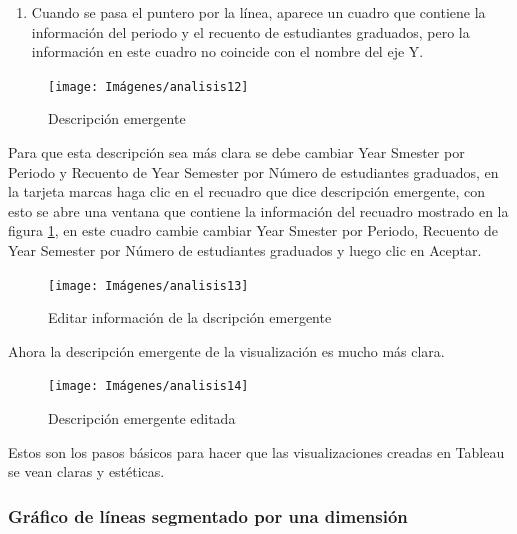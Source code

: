 \documentclass[
]{book}
\providecommand{\tightlist}{%
  \setlength{\itemsep}{0pt}\setlength{\parskip}{0pt}}
\begin{document}
\begin{enumerate}
\def\labelenumi{\arabic{enumi}.}
\setcounter{enumi}{7}
\tightlist
\item
  Cuando se pasa el puntero por la línea, aparece un cuadro que contiene la información del periodo y el recuento de estudiantes graduados, pero la información en este cuadro no coincide con el nombre del eje Y.
\end{enumerate}

\begin{figure}

{\centering \texttt{[image: Imágenes/analisis12]} 

}

\caption{Descripción emergente}\label{fig:paso8-1lineas-fig}
\end{figure}

Para que esta descripción sea más clara se debe cambiar Year Smester por Periodo y Recuento de Year Semester por Número de estudiantes graduados, en la tarjeta marcas haga clic en el recuadro que dice descripción emergente, con esto se abre una ventana que contiene la información del recuadro mostrado en la figura \ref{fig:paso8-1lineas-fig}, en este cuadro cambie cambiar Year Smester por Periodo, Recuento de Year Semester por Número de estudiantes graduados y luego clic en Aceptar.

\begin{figure}

{\centering \texttt{[image: Imágenes/analisis13]} 

}

\caption{Editar información de la dscripción emergente}\label{fig:paso8-2lineas-fig}
\end{figure}

Ahora la descripción emergente de la visualización es mucho más clara.

\begin{figure}

{\centering \texttt{[image: Imágenes/analisis14]} 

}

\caption{Descripción emergente editada}\label{fig:paso8-3lineas-fig}
\end{figure}

Estos son los pasos básicos para hacer que las visualizaciones creadas en Tableau se vean claras y estéticas.

\hypertarget{graficodelineassegmentado}{%
\subsubsection{Gráfico de líneas segmentado por una dimensión}\label{graficodelineassegmentado}}
\end{document}
